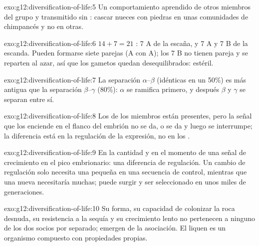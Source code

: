 \begin{solution}{exo:g12:diversification-of-life:5}
Un comportamiento aprendido de otros miembros del grupo y transmitido
sin : cascar nueces con piedras en unas comunidades de chimpancés
y no en otras.
\end{solution}

\begin{solution}{exo:g12:diversification-of-life:6}
$14 + 7 = 21$ : 7 A de la escaña, y 7 A y 7 B de la escanda.
Pueden formarse siete parejas (A con A); los 7  B no tienen
pareja y se reparten al azar, así que los gametos quedan
desequilibrados: estéril.
\end{solution}

\begin{solution}{exo:g12:diversification-of-life:7}
La separación $\alpha$--$\beta$ (idénticas en un 50\%) es más antigua
que la separación $\beta$--$\gamma$ (80\%): $\alpha$ se ramifica
primero, y después $\beta$ y $\gamma$ se separan entre sí.
\end{solution}

\begin{solution}{exo:g12:diversification-of-life:8}
Los  de los miembros están presentes, pero la señal que los
enciende en el flanco del embrión no se da, o se da y luego se
interrumpe; la diferencia está en la regulación de la expresión, no en
los .
\end{solution}

\begin{solution}{exo:g12:diversification-of-life:9}
En la cantidad y en el momento de una señal de crecimiento en el pico
embrionario: una diferencia de regulación. Un cambio de regulación solo
necesita una  pequeña en una secuencia de control, mientras que
una  nueva necesitaría muchas; puede surgir y ser seleccionado
en unos miles de generaciones.
\end{solution}

\begin{solution}{exo:g12:diversification-of-life:10}
Su forma, su capacidad de colonizar la roca desnuda, su resistencia a
la sequía y su crecimiento lento no pertenecen a ninguno de los dos
socios por separado; emergen de la asociación. El liquen es un
organismo compuesto con propiedades propias.
\end{solution}

